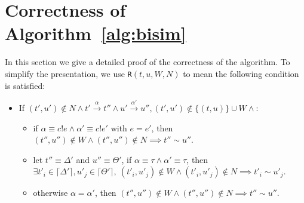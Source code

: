 \documentclass[a4paper,UKenglish,cleveref, autoref]{lipics-v2019}
\begin{document}
\section{Correctness of Algorithm~\ref{alg:bisim}}
\label{sec:correctness}

In this section we give a detailed proof of the  correctness of the algorithm. To simplify the presentation, we use \texttt{R}$(t,u,W,N)$ to mean the following condition is satisfied:
\begin{itemize}
	\item If $(t',u')\notin N\wedge t'\xrightarrow{\alpha}t''\wedge u'\xrightarrow{\alpha'}u'', (t',u')\notin\{(t,u)\}\cup W\wedge$: 
	\begin{itemize}
		\item if $\alpha\equiv c!e\wedge\alpha'\equiv c!e'$ with $e=e'$, then $(t'',u'')\notin W\wedge(t'',u'')\notin N\implies t''\sim u''$.
		\item let $t''\equiv \Delta'$ and $u''\equiv \Theta'$, if $\alpha\equiv \tau\wedge\alpha'\equiv \tau$, then $\exists t'_i\in \lceil\Delta'\rceil, u'_j\in \lceil\Theta'\rceil,\ (t'_i,u'_j)\notin W\wedge(t'_i,u'_j)\notin N\implies t'_i\sim u'_j$.
		\item otherwise $\alpha=\alpha'$, then  $(t'',u'')\notin W\wedge(t'',u'')\notin N\implies t''\sim u''$.
	\end{itemize}
\end{itemize}
\end{document}
